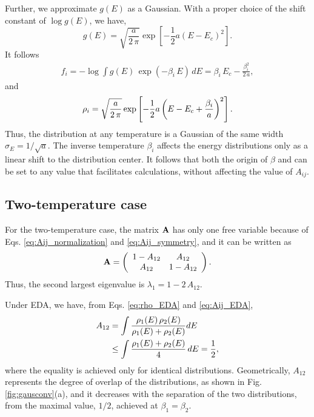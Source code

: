 \documentclass[aip,jcp,preprint,superscriptaddress]{revtex4-1}
\begin{document}
Further, we approximate $g(E)$
as a Gaussian.
%
With a proper choice of the shift constant of
$\log g(E)$, we have,
%
\begin{equation}
g(E)
=
\sqrt{
  \frac{ a } { 2 \, \pi }
}
\exp\left[ -\frac 1 2 a (E - E_c)^2 \right].
\label{eq:gE_Gaussian}
\end{equation}
%
It follows
%
\begin{align}
f_i
=
-\log
\int
g(E) \, \exp(-\beta_i \, E) \, dE
=
\beta_i \, E_c - \frac{ \beta_i^2 }{ 2 \, a },
\label{eq:f_Gaussian}
\end{align}
%
and
\begin{align}
\rho_i
=
\sqrt{ \frac a { 2 \, \pi} }
\exp\left[
  -\frac 1 2
  a \left(
    E - E_c + \frac { \beta_i } { a }
  \right)^2
\right].
\notag
\end{align}
%
Thus,
the distribution at any temperature
is a Gaussian of the same width
$\sigma_E = 1/\sqrt{a}$.
%
The inverse temperature $\beta_i$
affects the energy distributions
only as a linear shift
to the distribution center.
%
It follows that both the origin of $\beta$
and 
can be set to any value
that facilitates calculations,
without affecting the value of $A_{ij}$.



\subsection{Two-temperature case}



For the two-temperature case,
the matrix $\mathbf{A}$ has only one free variable
because of Eqs. \eqref{eq:Aij_normalization}
and \eqref{eq:Aij_symmetry},
and it can be written as
%
\begin{align*}
\mathbf{A}
=
\left(
\begin{array}{ccc}
  1 - A_{12} & A_{12} \\
  A_{12}     & 1 - A_{12}
\end{array}
\right).
\end{align*}
%
Thus,
the second largest eigenvalue is
$\lambda_1 = 1 - 2 \, A_{12}$.



Under EDA,
we have, from
Eqs. \eqref{eq:rho_EDA} and \eqref{eq:Aij_EDA},
%
\begin{align}
A_{12}
&=
\int
\frac{ \rho_1(E) \, \rho_2(E) }
{ \rho_1(E) + \rho_2(E) }
dE
\notag \\
&\le
\int
\frac{ \rho_1(E) + \rho_2(E) }
{ 4 }
\, dE
= \frac 1 2,
\notag
\end{align}
where
the equality is achieved
only for identical distributions.
%
Geometrically,
$A_{12}$
represents the degree of overlap
of the distributions,
as shown in Fig. \ref{fig:gausconv}(a),
%
and it decreases
with the separation
of the two distributions,
from the maximal value, $1/2$,
achieved at $\beta_1 = \beta_2$.
\end{document}
